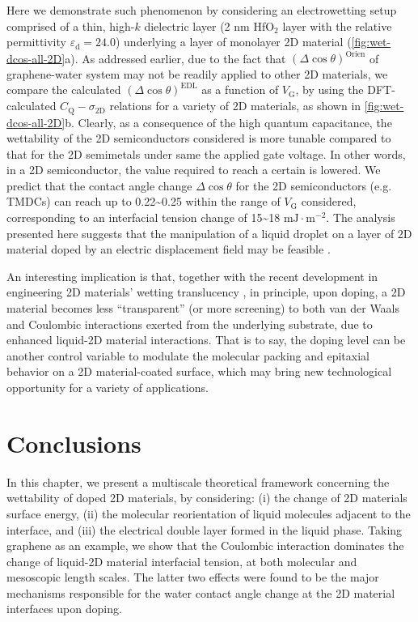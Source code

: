 Here we demonstrate such phenomenon by considering an electrowetting
setup comprised of a thin, high-\(k\) dielectric layer (2 nm
HfO\(_{\text{2}}\) layer with the relative permittivity
\(\varepsilon_{\mathrm{d}}=24.0\)) underlying a layer of monolayer 2D
material (\autoref{fig:wet-dcos-all-2D}a).  As addressed earlier, due
to the fact that \((\Delta \cos \theta)^{\mathrm{Orien}}\) of
graphene-water system may not be readily applied to other 2D
materials, we compare the calculated
\((\Delta \cos \theta)^{\mathrm{EDL}}\) as a function of
\(V_{\mathrm{G}}\), by using the DFT-calculated
\(C_{\mathrm{Q}} - \sigma_{\mathrm{2D}}\) relations for a variety of
2D materials, as shown in \autoref{fig:wet-dcos-all-2D}b. Clearly, as a
consequence of the high quantum capacitance, the wettability of the 2D
semiconductors considered is more tunable compared to that for the 2D
semimetals under same the applied gate voltage. In other words, in a 2D
semiconductor, the value required to reach a certain is lowered. We
predict that the contact angle change \(\Delta \cos \theta\) for the
2D semiconductors (e.g. TMDCs) can reach up to
0.22\textasciitilde{}0.25 within the range of \(V_{\mathrm{G}}\)
considered, corresponding to an interfacial tension change of
15\textasciitilde{}18 \(\mathrm{mJ} \cdot \mathrm{m}^{-2}\). The
analysis presented here suggests that the manipulation of a liquid
droplet on a layer of 2D material doped by an electric displacement
field may be feasible \cite{Mugele_2005_EW_rev,Hayes_2003_nature_EWOD}.

An interesting implication is that, together with the recent
development in engineering 2D materials’ wetting translucency
\cite{Raj_2013_wetting_rev,rafiee_2012_transparency,Shih_2012_prl,shih_2013_wetting_natmat},
in principle, upon doping, a 2D material becomes less “transparent” (or more screening)
to both van der Waals and Coulombic interactions exerted from the underlying
substrate, due to enhanced liquid-2D material interactions. That is to say, the doping level can be
another control variable to modulate the molecular packing and
epitaxial behavior on a 2D material-coated surface, which may bring
new technological opportunity for a variety of applications.


\section{Conclusions}
\label{sec:wet-conclusions}

In this chapter, we present a multiscale theoretical framework
concerning the wettability of doped 2D materials, by considering: (i)
the change of 2D materials surface energy, (ii) the molecular
reorientation of liquid molecules adjacent to the interface, and (iii)
the electrical double layer formed in the liquid phase. Taking
graphene as an example, we show that the Coulombic interaction
dominates the change of liquid-2D material interfacial tension, at
both molecular and mesoscopic length scales. The latter two effects were
found to be the major mechanisms responsible for the water contact angle
change at the 2D material interfaces upon doping.

